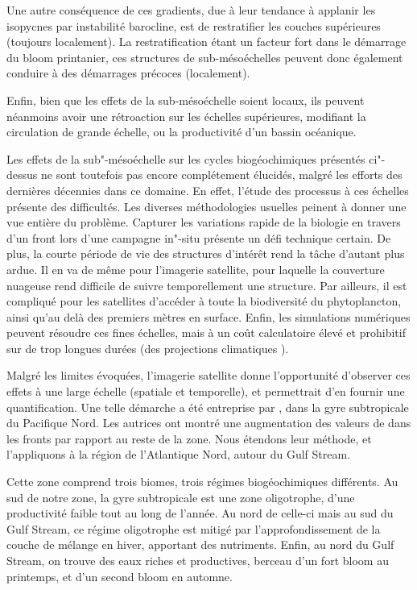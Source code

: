 Une autre conséquence de ces gradients, due à leur tendance à applanir les isopycnes par instabilité barocline, est de restratifier les couches supérieures (toujours localement).
La restratification étant un facteur fort dans le démarrage du bloom printanier, ces structures de sub-mésoéchelles peuvent donc également conduire à des démarrages précoces (localement).

Enfin, bien que les effets de la sub-mésoéchelle soient locaux, ils peuvent néanmoins avoir une rétroaction sur les échelles supérieures, modifiant la circulation de grande échelle, ou la productivité d'un bassin océanique.

Les effets de la sub"-mésoéchelle sur les cycles biogéochimiques présentés ci"-dessus ne sont toutefois pas encore complétement élucidés, malgré les efforts des dernières décennies dans ce domaine.
En effet, l'étude des processus à ces échelles présente des difficultés.
Les diverses méthodologies usuelles peinent à donner une vue entière du problème.
Capturer les variations rapide de la biologie en travers d'un front lors d'une campagne in"-situ présente un défi technique certain.
De plus, la courte période de vie des structures d'intérêt rend la tâche d'autant plus ardue.
Il en va de même pour l'imagerie satellite, pour laquelle la couverture nuageuse rend difficile de suivre temporellement une structure.
Par ailleurs, il est compliqué pour les satellites d'accéder à toute la biodiversité du phytoplancton, ainsi qu'au delà des premiers mètres en surface.
Enfin, les simulations numériques peuvent résoudre ces fines échelles, mais à un coût calculatoire élevé et prohibitif sur de trop longues durées (des projections climatiques ).

Malgré les limites évoquées, l'imagerie satellite donne l'opportunité d'observer ces effets à une large échelle (spatiale et temporelle), et permettrait d'en fournir une quantification.
Une telle démarche a été entreprise par \textcite{liu_2016}, dans la gyre subtropicale du Pacifique Nord.
Les autrices  ont montré une augmentation des valeurs de  dans les fronts par rapport au reste de la zone.
Nous étendons leur méthode, et l'appliquons à la région de l'Atlantique Nord, autour du Gulf Stream.

Cette zone comprend trois biomes,  trois régimes biogéochimiques différents.
Au sud de notre zone, la gyre subtropicale est une zone oligotrophe, d'une productivité faible tout au long de l'année.
Au nord de celle-ci mais au sud du Gulf Stream, ce régime oligotrophe est mitigé par l'approfondissement de la couche de mélange en hiver, apportant des nutriments.
Enfin, au nord du Gulf Stream, on trouve des eaux riches et productives, berceau d'un fort bloom au printemps, et d'un second bloom en automne.

